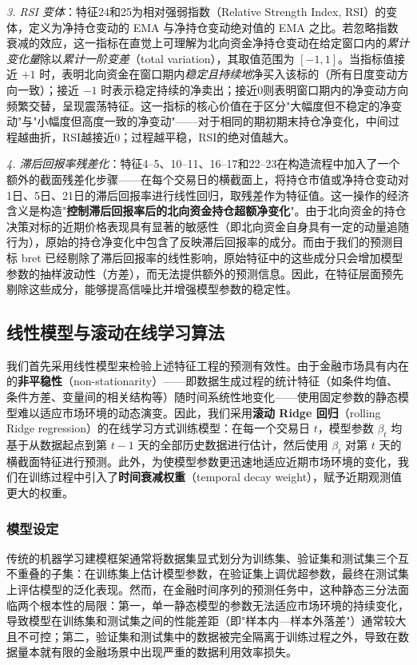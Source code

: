 \documentclass{article}
\begin{document}
\textit{3. RSI 变体}：特征24和25为相对强弱指数（Relative Strength Index, RSI）的变体，定义为净持仓变动的 EMA 与净持仓变动绝对值的 EMA 之比。若忽略指数衰减的效应，这一指标在直觉上可理解为北向资金净持仓变动在给定窗口内的\textit{累计变化量}除以\textit{累计一阶变差}（total variation），其取值范围为 $[-1, 1]$。当指标值接近 $+1$ 时，表明北向资金在窗口期内\textit{稳定且持续地}净买入该标的（所有日度变动方向一致）；接近 $-1$ 时表示稳定持续的净卖出；接近0则表明窗口期内的净变动方向频繁交替，呈现震荡特征。这一指标的核心价值在于区分"大幅度但不稳定的净变动"与"小幅度但高度一致的净变动"——对于相同的期初期末持仓净变化，中间过程越曲折，RSI越接近0；过程越平稳，RSI的绝对值越大。

\textit{4. 滞后回报率残差化}：特征4--5、10--11、16--17和22--23在构造流程中加入了一个额外的截面残差化步骤——在每个交易日的横截面上，将持仓市值或净持仓变动对1日、5日、21日的滞后回报率进行线性回归，取残差作为特征值。这一操作的经济含义是构造"\textbf{控制滞后回报率后的北向资金持仓超额净变化}"。由于北向资金的持仓决策对标的近期价格表现具有显著的敏感性（即北向资金自身具有一定的动量追随行为），原始的持仓净变化中包含了反映滞后回报率的成分。而由于我们的预测目标 bret 已经剔除了滞后回报率的线性影响，原始特征中的这些成分只会增加模型参数的抽样波动性（方差），而无法提供额外的预测信息。因此，在特征层面预先剔除这些成分，能够提高信噪比并增强模型参数的稳定性。

\subsection{线性模型与滚动在线学习算法}
\label{sec:linear_model}

我们首先采用线性模型来检验上述特征工程的预测有效性。由于金融市场具有内在的\textbf{非平稳性}（non-stationarity）——即数据生成过程的统计特征（如条件均值、条件方差、变量间的相关结构等）随时间系统性地变化——使用固定参数的静态模型难以适应市场环境的动态演变。因此，我们采用\textbf{滚动 Ridge 回归}（rolling Ridge regression）的在线学习方式训练模型：在每一个交易日 $t$，模型参数 $\beta_t$ 均基于从数据起点到第 $t-1$ 天的全部历史数据进行估计，然后使用 $\beta_t$ 对第 $t$ 天的横截面特征进行预测。此外，为使模型参数更迅速地适应近期市场环境的变化，我们在训练过程中引入了\textbf{时间衰减权重}（temporal decay weight），赋予近期观测值更大的权重。

\subsubsection{模型设定}
\label{sec:linear_setup}

传统的机器学习建模框架通常将数据集显式划分为训练集、验证集和测试集三个互不重叠的子集：在训练集上估计模型参数，在验证集上调优超参数，最终在测试集上评估模型的泛化表现。然而，在金融时间序列的预测任务中，这种静态三分法面临两个根本性的局限：第一，单一静态模型的参数无法适应市场环境的持续变化，导致模型在训练集和测试集之间的性能差距（即"样本内—样本外落差"）通常较大且不可控；第二，验证集和测试集中的数据被完全隔离于训练过程之外，导致在数据量本就有限的金融场景中出现严重的数据利用效率损失。
\end{document}
